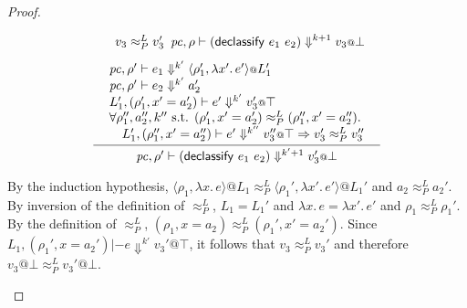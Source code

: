 \documentclass{article}
\makeatletter
\newcommand{\at}{\ensuremath{{\scriptstyle{@}}}}
\newcommand{\pc}{\ensuremath{{\mathit{pc}}}}
\theoremstyle{definition}
\newtheorem{corollary}{Corollary}
\makeatother
\begin{document}
\begin{proof}
\begin{description}
\begin{small}
\begin{gather*}
{{\begin{array}{l}
            v_3 \approx^{L}_{P} v_3'
          \end{array}}
      }{
        \pc, \rho |- (\mathsf{declassify}\ e_1\ e_2) \Downarrow^{k+1}
        v_3 \at \bot
      }
      \\[1ex]
      \inference{
        {\begin{array}{l}
            \pc, \rho' |- e_1 \Downarrow^{k'}
            \langle{\rho_1', \lambda{x'}.\, e'\rangle} \at L_1'
            \\
            \pc, \rho' |- e_2 \Downarrow^{k'} a_2'
            \\
            L_1',  (\rho_1', x' = a_2') |- e' \Downarrow^{k'} v_3' \at \top
            \\
            \forall{\rho_1'', a_2'', k'' \text{ s.t. }
              (\rho_1', x' = a_2') \approx^{L}_{P} (\rho_1'', x' = a_2'')}.
            \\\quad
            L_1', (\rho_1'', x' = a_2'') |- e' \Downarrow^{k''} v_3'' \at \top =>
            v_3' \approx^{L}_{P} v_3''
          \end{array}}
      }{
        \pc, \rho' |- (\mathsf{declassify}\ e_1\ e_2) \Downarrow^{k'+1}
        v_3' \at \bot
      }
    \end{gather*}
    \end{small}
  
    By the induction hypothesis,
    $\langle{\rho_1, \lambda{x}.\, e\rangle} \at L_1
    \approx^{L}_{P}
    \langle{\rho_1', \lambda{x'}.\, e'\rangle} \at L_1'$
    and
    $a_2 \approx^{L}_{P} a_2'$.
    By inversion of the definition of $\approx^{L}_{P}$,
    $L_1 = L_1'$ and
    $\lambda{x}.\, e = \lambda{x'}.\, e'$ and
    $\rho_1 \approx^{L}_{P} \rho_1'$.
    By the definition of $\approx^{L}_{P}$,
    $(\rho_1, x = a_2) \approx^{L}_{P} (\rho_1', x' = a_2')$.
    Since $L_1, (\rho_1', x = a_2') |- e \Downarrow^{k'} v_3' \at \top$,
    it follows that $v_3 \approx^{L}_{P} v_3'$ and therefore
    $v_3 \at \bot \approx^{L}_{P} v_3' \at \bot$.
    \qedhere
  \end{description}
\end{proof}

\end{document}
